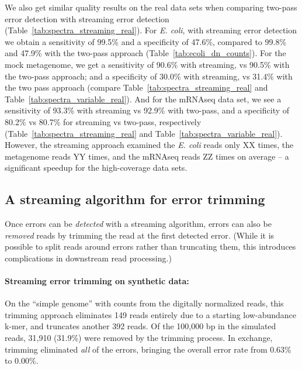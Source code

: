 \documentclass{article}
\begin{document}
We also get similar quality results on the real data sets when
comparing two-pass error detection with streaming error detection
(Table~\ref{tab:spectra_streaming_real}).  For {\em E. coli}, with
streaming error detection we obtain a sensitivity of 99.5\% and a
specificity of 47.6\%, compared to 99.8\% and 47.9\% with the two-pass
approach (Table~\ref{tab:ecoli_dn_counts}).  For the mock metagenome,
we get a sensitivity of 90.6\% with streaming, vs 90.5\% with the
two-pass approach; and a specificity of 30.0\% with streaming, vs
31.4\% with the two pass approach (compare
Table~\ref{tab:spectra_streaming_real} and
Table~\ref{tab:spectra_variable_real}).  And for the mRNAseq data set,
we see a sensitivity of 93.3\% with streaming vs 92.9\% with two-pass,
and a specificity of 80.2\% vs 80.7\% for streaming vs two-pass,
respectively (Table~\ref{tab:spectra_streaming_real} and
Table~\ref{tab:spectra_variable_real}).  However, the streaming
approach examined the {\em E. coli} reads only XX times, the
metagenome reads YY times, and the mRNAseq reads ZZ times on average --
a significant speedup for the high-coverage data sets.

\subsection{A streaming algorithm for error trimming}

Once errors can be {\em detected} with a streaming algorithm, errors
can also be {\em removed} reads by trimming the read at the first
detected error.  (While it is possible to split reads around errors
rather than truncating them, this introduces complications in
downstream read processing.)


\paragraph{Streaming error trimming on synthetic data:}

On the ``simple genome'' with counts from the digitally normalized
reads, this trimming approach eliminates 149 reads entirely due to a
starting low-abundance k-mer, and truncates another 392 reads.  Of the
100,000 bp in the simulated reads, 31,910 (31.9\%) were removed by the
trimming process.  In exchange, trimming eliminated {\em all} of the
errors, bringing the overall error rate from 0.63\% to 0.00\%.

\end{document}
